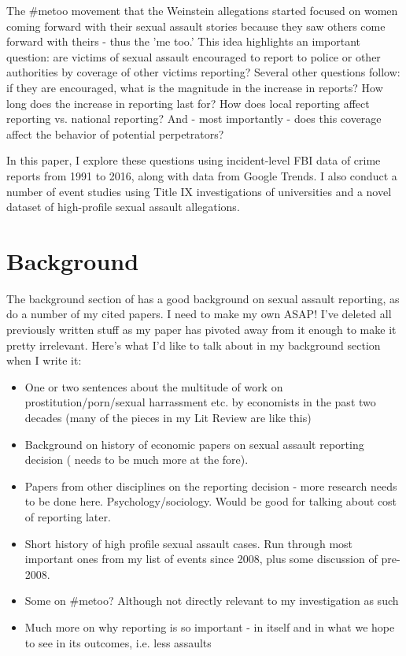 \documentclass[AER,draftmode]{AEA}
\begin{document}
The #metoo movement that the Weinstein allegations started focused on women coming forward with their sexual assault stories because they saw others come forward with theirs - thus the 'me too.' This idea highlights an important question: are victims of sexual assault encouraged to report to police or other authorities by coverage of other victims reporting? Several other questions follow: if they are encouraged, what is the magnitude in the increase in reports? How long does the increase in reporting last for? How does local reporting affect reporting vs. national reporting? And - most importantly - does this coverage affect the behavior of potential perpetrators?

In this paper, I explore these questions using incident-level FBI data of crime reports from 1991 to 2016, along with data from Google Trends. I also conduct a number of event studies using Title IX investigations of universities and a novel dataset of high-profile sexual assault allegations. 


\section{Background}

The background section of \cite{lindo_college_2018} has a good background on sexual assault reporting, as do a number of my cited papers. I need to make my own ASAP! I've deleted all previously written stuff as my paper has pivoted away from it enough to make it pretty irrelevant. Here's what I'd like to talk about in my background section when I write it:

\begin{itemize}
    \item One or two sentences about the multitude of work on prostitution/porn/sexual harrassment etc. by economists in the past two decades (many of the pieces in my Lit Review are like this)
    \item Background on history of economic papers on sexual assault reporting decision ( needs to be much more at the fore). 
    \item Papers from other disciplines on the reporting decision - more research needs to be done here. Psychology/sociology. Would be good for talking about cost of reporting later.
    \item Short history of high profile sexual assault cases. Run through most important ones from my list of events since 2008, plus some discussion of pre-2008.
    \item Some on #metoo? Although not directly relevant to my investigation as such
    \item Much more on why reporting is so important - in itself and in what we hope to see in its outcomes, i.e. less assaults
\end{itemize}
\end{document}

